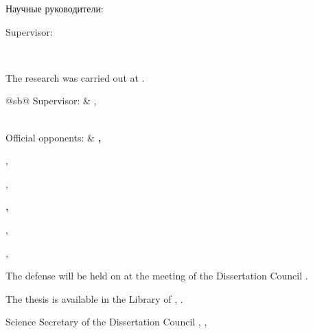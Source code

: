 %
\vspace{0pt plus4fill} %
\begin{flushright}
	\ifdefined\supervisorTwoFio
	Научные руководители:
	
	\supervisorRegaliaEn
	
	\ifdefined\supervisorDead
	\framebox{\supervisorFio}
	\else
	\supervisorFio
	\fi
	
	\supervisorTwoRegalia
	
	\ifdefined\supervisorTwoDead
	\framebox{\supervisorTwoFio}
	\else
	\supervisorTwoFio
	\fi
	\else
	Supervisor:
	
	\supervisorRegaliaEn
	
	\ifdefined\supervisorDead
	\framebox{\supervisorFioEn}
	\else
	\supervisorFioEn
	\fi
	\fi
	
\end{flushright}
%
\vspace{0pt plus4fill} %
{\centering\thesisCityEn\ \thesisYear\par}

\clearpage

\thispagestyle{empty}
\noindent The research was carried out at {\thesisOrganizationEn}.

\vspace{0.008\paperheight plus1fill}
\noindent%
\begin{tabularx}{\textwidth}{@{}sb@{}}
	Supervisor:   & \supervisorRegaliaEn,\par
	\textbf{\supervisorFioEn}
	\vspace{0.013\paperheight}\\
	
	Official opponents:  &
	\textbf{\opponentOneFioEn,}\par
	\opponentOneRegaliaEn,\par
	\opponentOneJobPlaceEn,\par
	\opponentOneJobPostEn\par
	\vspace{0.01\paperheight}
	\textbf{\opponentTwoFioEn,}\par
	\opponentTwoRegaliaEn,\par
	\opponentTwoJobPlaceEn,\par
	\opponentTwoJobPostEn
\end{tabularx}

\vspace{0.008\paperheight plus1fill}
\noindent The defense will be held on {} at the meeting of the {\thesisOrganizationEn} Dissertation Council {}.

\vspace{0.008\paperheight plus1fill}
\noindent The thesis is available in the Library of \thesisOrganizationEn, \synopsisLibraryEn.

\vspace{0.008\paperheight plus1fill}
\noindent Science Secretary of the {\thesisOrganizationEn} Dissertation Council , , 
